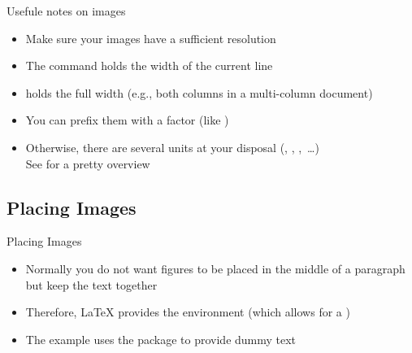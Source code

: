 \savebox{}
\begin{frame}{Usefule notes on images}
   \begin{itemize}
      \itemsep8pt
      \item Make sure your images have a sufficient resolution
      \item The command \blatex{\\linewidth} holds the width of the current line
      \item \blatex{\\textwidth} holds the full width (e.g., both columns in a multi-column document)
      \item You can prefix them with a factor (like )
      \item Otherwise, there are several units at your disposal (, , ,~\ldots)\\See {} for a pretty overview
   \end{itemize}
\end{frame}

\subsection{Placing Images}

\begin{frame}{Placing Images}
   \begin{itemize}
      \item Normally you do not want figures to be placed in the middle of a paragraph but keep the text together
      \item Therefore, \LaTeX{} provides the  environment (which allows for a \blatex{\\caption})
      \item The example uses the  package to provide dummy text
   \end{itemize}
\end{frame}


